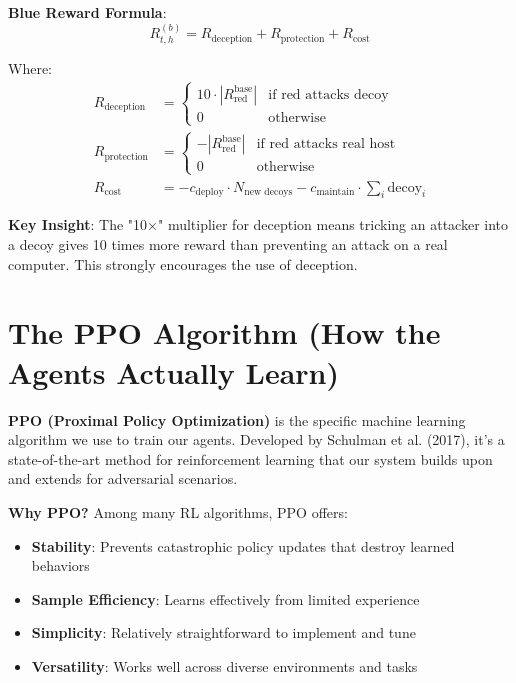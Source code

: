 \documentclass[11pt]{article}
\begin{document}
\begin{mathdetails}
\textbf{Blue Reward Formula}:
$$R^{(b)}_{t,h} = R_{\text{deception}} + R_{\text{protection}} + R_{\text{cost}}$$

Where:
\begin{align}
R_{\text{deception}} &= \begin{cases}
10 \cdot |R_{\text{red}}^{\text{base}}| & \text{if red attacks decoy} \\
0 & \text{otherwise}
\end{cases} \\
R_{\text{protection}} &= \begin{cases}
-|R_{\text{red}}^{\text{base}}| & \text{if red attacks real host} \\
0 & \text{otherwise}
\end{cases} \\
R_{\text{cost}} &= -c_{\text{deploy}} \cdot N_{\text{new decoys}} - c_{\text{maintain}} \cdot \sum_i \text{decoy}_i
\end{align}

\textbf{Key Insight}: The "10×" multiplier for deception means tricking an attacker into a decoy gives 10 times more reward than preventing an attack on a real computer. This strongly encourages the use of deception.
\end{mathdetails}

\section{The PPO Algorithm (How the Agents Actually Learn)}

\begin{foundation}
\textbf{PPO (Proximal Policy Optimization)} is the specific machine learning algorithm we use to train our agents. Developed by Schulman et al. (2017), it's a state-of-the-art method for reinforcement learning that our system builds upon and extends for adversarial scenarios.
\end{foundation}

\begin{mathdetails}
\textbf{Why PPO?} Among many RL algorithms, PPO offers:
\begin{itemize}
\item \textbf{Stability}: Prevents catastrophic policy updates that destroy learned behaviors
\item \textbf{Sample Efficiency}: Learns effectively from limited experience
\item \textbf{Simplicity}: Relatively straightforward to implement and tune
\item \textbf{Versatility}: Works well across diverse environments and tasks
\end{itemize}
\end{mathdetails}
\end{document}
